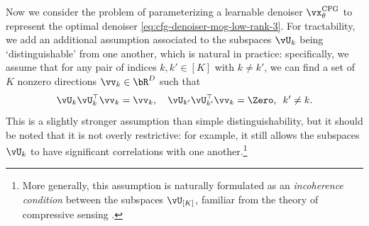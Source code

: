 \documentclass[../../book-main.tex]{subfiles}
\begin{document}
\begin{example}
    Now we consider the problem of parameterizing a learnable denoiser
    $\vx_{\theta}^{\mathrm{CFG}}$ to represent the optimal denoiser
    \eqref{eq:cfg-denoiser-mog-low-rank-3}.
    For tractability, we add an additional assumption associated to
    the subspaces
    $\vU_k$ being `distinguishable' from one another, which is natural in
    practice: specifically, we assume that for any pair of indices $k, k' \in
    [K]$ with $k \neq k'$, we can find a set of $K$ nonzero directions
    $\vv_{k} \in \bR^D$ such
    that
    \begin{equation}
        \vU_{k}\vU_{k}^\top \vv_k = \vv_k, \quad
        \vU_{k'}\vU_{k'}^\top \vv_k = \Zero, \enspace k' \neq k.
    \end{equation}
    This is a slightly stronger assumption than simple
    distinguishability, but it
    should be noted that it is not overly restrictive: for example, it still
    allows the subspaces $\vU_{k}$ to have significant correlations with one
    another.\footnote{ More generally, this assumption is naturally
        formulated as an
        \textit{incoherence condition} between the subspaces
        $\vU_{[K]}$, familiar from the theory of compressive sensing
    \cite{Wright-Ma-2022}.}


\end{example}
\end{document}
